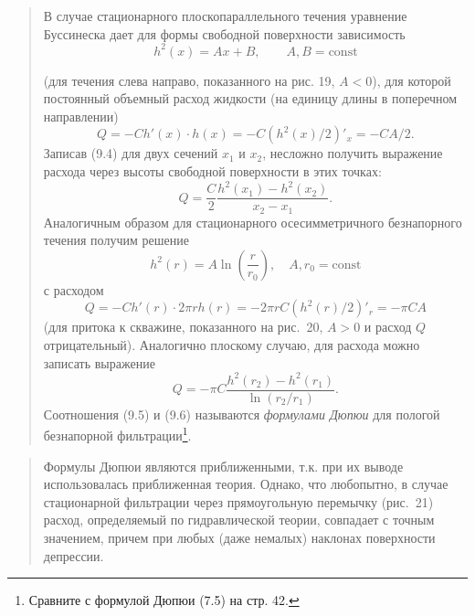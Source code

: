 \documentclass[12pt,a4paper]{article}
\begin{document}
\begin{quote}\sloppy
В случае стационарного плоскопараллельного течения уравнение Буссинеска дает для формы свободной поверхности зависимость
\begin{equation}h^2(x)=Ax+B,\qquad A,B=\mathrm{const}\tag{9.4}\label{q6:eq-9-4}\end{equation}

(для течения слева направо, показанного на рис. 19, $A<0$), для которой постоянный объемный расход жидкости (на единицу длины в поперечном направлении)
\[Q=-Ch'(x)\cdot h(x)=-C(h^2(x)/2)'_x=-CA/2.\]
Записав (9.4) для двух сечений $x_1$ и $x_2$, несложно получить выражение расхода через высоты свободной поверхности в этих точках:
\begin{equation}Q=\frac{C}{2}\frac{h^2(x_1)-h^2(x_2)}{x_2-x_1}.\tag{9.5}\label{q6:eq-9-5}\end{equation}
Аналогичным образом для стационарного осесимметричного безнапорного течения получим решение
\[h^2(r)=A\ln\left(\frac{r}{r_0}\right),\quad A,r_0=\mathrm{const}\]
с расходом
\[Q=-Ch'(r)\cdot2\pi rh(r)=-2\pi rC(h^2(r)/2)'_r=-\pi CA\]
(для притока к скважине, показанного на рис.~20, $A>0$ и расход $Q$ отрицательный). Аналогично плоскому случаю, для расхода можно записать выражение
\begin{equation}Q=-\pi C\frac{h^2(r_2)-h^2(r_1)}{\ln(r_2/r_1)}.\tag{9.6}\label{q6:eq-9-6}\end{equation}
Соотношения (9.5) и (9.6) называются \textit{формулами Дюпюи} для пологой безнапорной фильтрации\setcounter{footnote}{0}\footnote{Сравните с формулой Дюпюи (7.5) на стр. 42.}.
\par\nobreak{}\par
\end{quote}

\begin{quote}\sloppy
Формулы Дюпюи являются приближенными, т.к. при их выводе использовалась приближенная теория. Однако, что любопытно, в случае стационарной фильтрации через прямоугольную перемычку (рис.~21) расход, определяемый по гидравлической теории, совпадает с точным значением, причем при любых (даже немалых) наклонах поверхности депрессии.

\par\nobreak{}\par
\end{quote}
\endgroup
\end{document}
